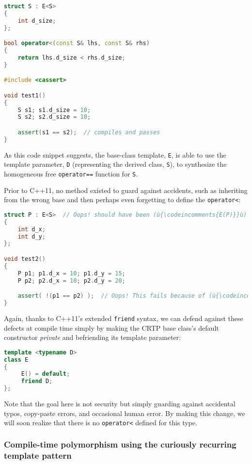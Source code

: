\begin{lstlisting}[language=C++]
struct S : E<S>
{
    int d_size;
};

bool operator<(const S& lhs, const S& rhs)
{
    return lhs.d_size < rhs.d_size;
}

#include <cassert>

void test1()
{
    S s1; s1.d_size = 10;
    S s2; s2.d_size = 10;

    assert(s1 == s2);  // compiles and passes
}
\end{lstlisting}

\noindent As this code snippet suggests, the base-class template, \texttt{E}, is
able to use the template parameter, \texttt{D} (representing the derived
class, \texttt{S}), to synthesize the homogeneous free
\texttt{operator==} function for \texttt{S}.

Prior to C++11, no method existed to guard against accidents, such as
inheriting from the wrong base and then perhaps even forgetting to
define the \texttt{operator<}:

\begin{lstlisting}[language=C++]
struct P : E<S>  // Oops! should have been (ù{\codeincomments{E(P)}}ù) -- a serious latent defect
{
    int d_x;
    int d_y;
};

void test2()
{
    P p1; p1.d_x = 10; p1.d_y = 15;
    P p2; p2.d_x = 10; p2.d_y = 20;

    assert( !(p1 == p2) );  // Oops! This fails because of (ù{\codeincomments{E(S)}}ù) above.
}
\end{lstlisting}

\noindent Again, thanks to C++11's extended \texttt{friend} syntax, we can defend
against these defects at compile time simply by making the CRTP base
class's default constructor \emph{private} and befriending its template
parameter:

\begin{lstlisting}[language=C++]
template <typename D>
class E
{
     E() = default;
     friend D;
};
\end{lstlisting}

\noindent Note that the goal here is not security but simply guarding against
accidental typos, copy-paste errors, and occasional  human error. By making this change, we will soon realize that there
is no \texttt{operator<} defined for this type.

\subsubsection[Compile-time polymorphism using the curiously recurring template pattern]{Compile-time polymorphism using the curiously recurring template pattern}\label{compile-time-polymorphism-using-crtp}

